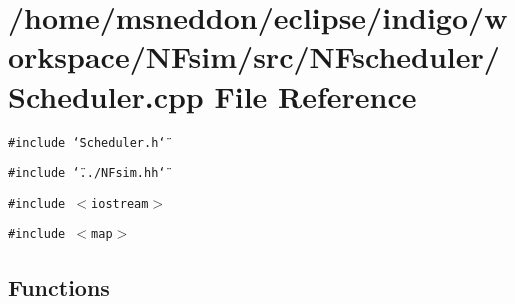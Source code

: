 \section{/home/msneddon/eclipse/indigo/workspace/NFsim/src/NFscheduler/Scheduler.cpp File Reference}
\label{Scheduler_8cpp}


{\tt \#include \char`\"{}Scheduler.h\char`\"{}}\par
{\tt \#include \char`\"{}../NFsim.hh\char`\"{}}\par
{\tt \#include $<$iostream$>$}\par
{\tt \#include $<$map$>$}\par
\subsection*{Functions}
